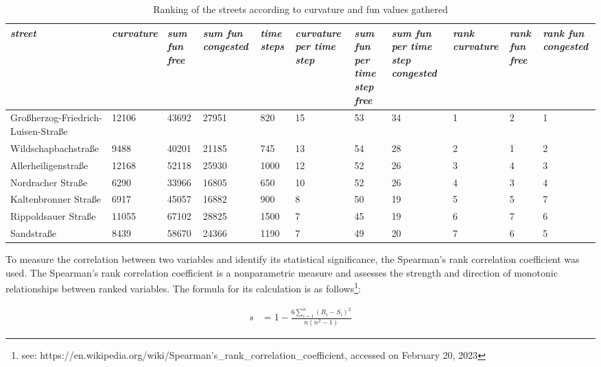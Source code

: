 \begin{landscape}
\begin{table}
\centering
\begin{tabular}{|p{3.5cm}|p{1.5cm}|p{1.5cm}|p{1.5cm}|p{1.5cm}|p{1.5cm}|p{1.5cm}|p{1.5cm}|p{1cm}|p{1cm}|p{1cm}|}
\toprule
\textit{street} & \textit{curvature} & \textit{sum fun free} & \textit{sum fun congested} & \textit{time steps} & \textit{curvature per time step} & \textit{sum fun per time step free} & \textit{sum fun per time step congested} & \textit{rank curvature} & \textit{rank fun free} & \textit{rank fun congested} \\
\midrule
Großherzog-Friedrich-Luisen-Straße  & 12106 & 43692 & 27951 & 820   & 15 & 53 & 34 & 1 & 2 & 1 \\
Wildschapbachstraße                 & 9488  & 40201 & 21185 & 745   & 13 & 54 & 28 & 2 & 1 & 2 \\
Allerheiligenstraße                 & 12168 & 52118 & 25930 & 1000  & 12 & 52 & 26 & 3 & 4 & 3 \\
Nordracher Straße                   & 6290  & 33966 & 16805 & 650   & 10 & 52 & 26 & 4 & 3 & 4 \\
Kaltenbronner Straße                & 6917  & 45057 & 16882 & 900   & 8  & 50 & 19 & 5 & 5 & 7 \\
Rippoldsauer Straße                 & 11055 & 67102 & 28825 & 1500  & 7  & 45 & 19 & 6 & 7 & 6 \\
Sandstraße                          & 8439  & 58670 & 24366 & 1190  & 7  & 49 & 20 & 7 & 6 & 5 \\
\bottomrule
\end{tabular}
\caption{Ranking of the streets according to curvature and fun values gathered}
\label{tab:ranking}
\end{table}
\end{landscape}

To measure the correlation between two variables and identify its statistical significance, the Spearman's rank correlation coefficient was used. The Spearman's rank correlation coefficient is a nonparametric measure and assesses the strength and direction of monotonic relationships between ranked variables. The formula for its calculation is as follows\footnote{see: https://en.wikipedia.org/wiki/Spearman's\_rank\_correlation\_coefficient, accessed on February 20, 2023}:

\begin{align}
s &= 1 - \frac{6 \sum_{i=1}^n (R_i - S_i)^2}{n(n^2 - 1)}
\label{eq:spearman}
\end{align}

